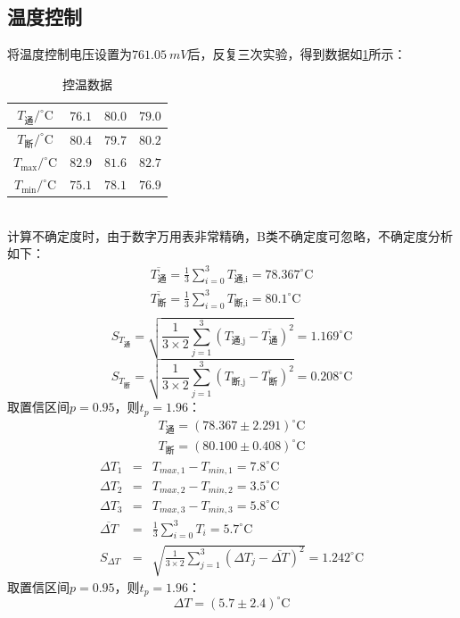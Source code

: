 \documentclass[a4paper,8pt,twocolumn]{article}
\begin{document}
\subsection{温度控制}
 将温度控制电压设置为$761.05~mV$后，反复三次实验，得到数据如\ref{Date_2}所示：\\
 \begin{table}[h]
  \centering
   \begin{tabular}{|c|c|c|c|}
    \hline
    $T_\text{通}/^\circ\text{C}$ & $76.1$ & $80.0$ & $79.0$ \\ 
    \hline
    $T_\text{断}/^\circ\text{C}$ & $80.4$ & $79.7$ & $80.2$ \\
    \hline
    $T_\text{max}/^\circ\text{C}$ & $82.9$ & $81.6$ & $82.7$ \\
    \hline
    $T_\text{min}/^\circ\text{C}$ & $75.1$ & $78.1$ & $76.9$ \\
    \hline
  \end{tabular}
  \caption{控温数据}
  \label{Date_2}
 \end{table}\\
 计算不确定度时，由于数字万用表非常精确，B类不确定度可忽略，不确定度分析如下：\\
 \begin{eqnarray*}
    \overline{T_\text{通}} = \frac{1}{3}\sum_{i = 0}^{3}T_\text{通,i} = 78.367^\circ\text{C} \\
    \overline{T_\text{断}} = \frac{1}{3}\sum_{i = 0}^{3}T_\text{断,i} = 80.1^\circ\text{C} \\
 \end{eqnarray*}
 \begin{equation*}
    S_{T_\text{通}} = \sqrt{\frac{1}{3\times2}\sum_{j = 1}^{3}(T_\text{通,j}-\overline{T_\text{通}})^2} = 1.169^\circ\text{C}
  \end{equation*}
  \begin{equation*}
    S_{T_\text{断}} = \sqrt{\frac{1}{3\times2}\sum_{j = 1}^{3}(T_\text{断,j}-\overline{T_\text{断}})^2} = 0.208^\circ\text{C}
  \end{equation*}
  取置信区间$p = 0.95$，则$t_p = 1.96$：
  \begin{eqnarray*}
    T_\text{通} = (78.367 \pm 2.291)^\circ\text{C}\\
    T_\text{断} = (80.100 \pm 0.408)^\circ\text{C}
  \end{eqnarray*}
  \begin{eqnarray*}
    \Delta T_1 &=& T_{max,1}-T_{min,1} = 7.8^\circ\text{C} \\
    \Delta T_2 &=& T_{max,2}-T_{min,2} = 3.5^\circ\text{C} \\
    \Delta T_3 &=& T_{max,3}-T_{min,3} = 5.8^\circ\text{C} \\
    \overline{\Delta T} &=& \frac{1}{3}\sum_{i = 0}^{3}T_i = 5.7^\circ\text{C} \\
    S_{\Delta T} &=& \sqrt{\frac{1}{3\times2}\sum_{j = 1}^{3}(\Delta T_j-\overline{\Delta T})^2} = 1.242^\circ\text{C}
  \end{eqnarray*}
  取置信区间$p = 0.95$，则$t_p = 1.96$：
  \begin{equation*}
    \Delta T = (5.7 \pm 2.4)^\circ\text{C}
  \end{equation*}
\end{document}
